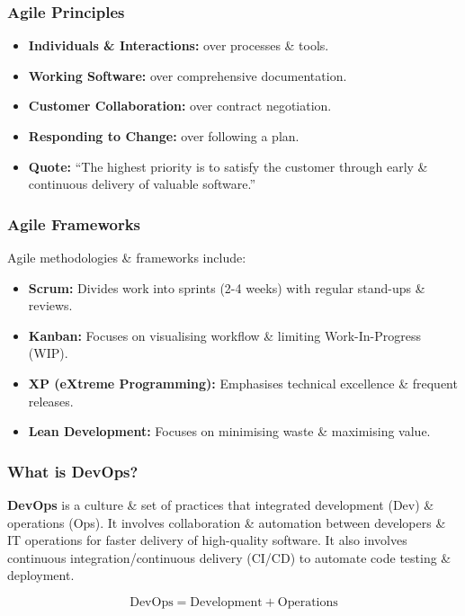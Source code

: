 \documentclass[a4paper,11pt]{article}
\begin{document}
\subsubsection{Agile Principles}
\begin{itemize}
    \item   \textbf{Individuals \& Interactions:} over processes \& tools.
    \item   \textbf{Working Software:} over comprehensive documentation.
    \item   \textbf{Customer Collaboration:} over contract negotiation.
    \item   \textbf{Responding to Change:} over following a plan.
    \item   \textbf{Quote:} ``The highest priority is to satisfy the customer through early \& continuous delivery of valuable software.''
\end{itemize}

\subsubsection{Agile Frameworks}
Agile methodologies \& frameworks include:
\begin{itemize}
    \item   \textbf{Scrum:} Divides work into sprints (2-4 weeks) with regular stand-ups \& reviews.
    \item   \textbf{Kanban:} Focuses on visualising workflow \& limiting Work-In-Progress (WIP).
    \item   \textbf{XP (eXtreme Programming):} Emphasises technical excellence \& frequent releases.
    \item   \textbf{Lean Development:} Focuses on minimising waste \& maximising value.
\end{itemize}

\subsubsection{What is DevOps?}
\textbf{DevOps} is a culture \& set of practices that integrated development (Dev) \& operations (Ops).
It involves collaboration \& automation between developers \& IT operations for faster delivery of high-quality software.
It also involves continuous integration/continuous delivery (CI/CD) to automate code testing \& deployment.

$$
    \text{DevOps} = \text{Development} + \text{Operations}
$$
\end{document}
